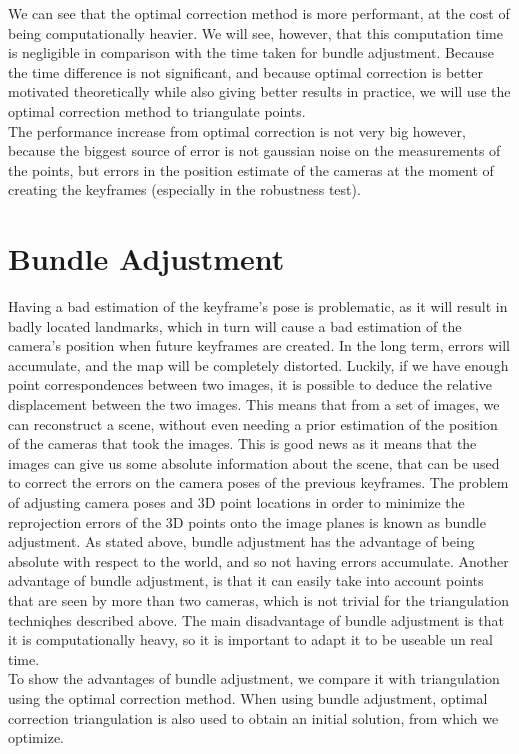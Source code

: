 We can see that the optimal correction method is more performant, at the cost of being computationally heavier. We will see, however, that this computation time is negligible in comparison with the time taken for bundle adjustment. Because the time difference is not significant, and because optimal correction is better motivated theoretically while also giving better results in practice, we will use the optimal correction method to triangulate points.\\
The performance increase from optimal correction is not very big however, because the biggest source of error is not gaussian noise on the measurements of the points, but errors in the position estimate of the cameras at the moment of creating the keyframes (especially in the robustness test).

\section{Bundle Adjustment}
Having a bad estimation of the keyframe's pose is problematic, as it will result in badly located landmarks, which in turn will cause a bad estimation of the camera's position when future keyframes are created. In the long term, errors will accumulate, and the map will be completely distorted. Luckily, if we have enough point correspondences between two images, it is possible to deduce the relative displacement between the two images. This means that from a set of images, we can reconstruct a scene, without even needing a prior estimation of the position of the cameras that took the images. This is good news as it means that the images can give us some absolute information about the scene, that can be used to correct the errors on the camera poses of the previous keyframes. The problem of adjusting camera poses and 3D point locations in order to minimize the reprojection errors of the 3D points onto the image planes is known as bundle adjustment. As stated above, bundle adjustment has the advantage of being absolute with respect to the world, and so not having errors accumulate. Another advantage of bundle adjustment, is that it can easily take into account points that are seen by more than two cameras, which is not trivial for the triangulation techniqhes described above. The main disadvantage of bundle adjustment is that it is computationally heavy, so it is important to adapt it to be useable un real time.\\
To show the advantages of bundle adjustment, we compare it with triangulation using the optimal correction method. When using bundle adjustment, optimal correction triangulation is also used to obtain an initial solution, from which we optimize.
